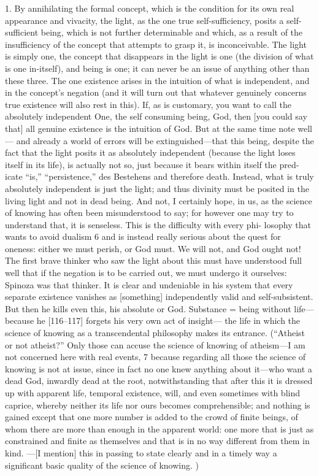 1.  By annihilating the formal concept,
which is the condition for its own real appearance and vivacity,
the light, as the one true self-sufficiency,
posits a self-sufficient being,
which is not further determinable and
which, as a result of the insufficiency of
the concept that attempts to grasp it,
is inconceivable.
The light is simply one,
the concept that disappears in the light is one
(the division of what is one in-itself),
and being is one;
it can never be an issue of anything other than these three.
The one existence arises in the intuition of what is independent,
and in the concept’s negation
(and it will turn out that whatever genuinely concerns
true existence will also rest in this).
If, as is customary, you want to call
the absolutely independent One,
the self consuming being, God,
then [you could say that] all
genuine existence is the intuition of God.
But at the same time note well—
and already a world of errors will be extinguished—that this being, despite the
fact that the light posits it as absolutely independent (because the light loses
itself in its life), is actually not so, just because it bears within itself the pred-
icate “is,” “persistence,” {des Bestehens} and therefore death.
Instead, what is
truly absolutely independent is just the light; and thus divinity must be posited
in the living light and not in dead being.
And not, I certainly hope, in us, as
the science of knowing has often been misunderstood to say; for however one
may try to understand that, it is senseless.
This is the difficulty with every phi-
losophy that wants to avoid dualism 6 and is instead really serious about the
quest for oneness: either we must perish, or God must.
We will not, and God
ought not! The first brave thinker who saw the light about this must have
understood full well that if the negation is to be carried out, we must undergo
it ourselves: Spinoza was that thinker.
It is clear and undeniable in his system
that every separate existence vanishes as [something] independently valid and
self-subsistent.
But then he kills even this, his absolute or God.
Substance =
being without life—because he [116–117] forgets his very own act of insight—
the life in which the science of knowing as a transcendental philosophy makes
its entrance.
(“Atheist or not atheist?” Only those can accuse the science of
knowing of atheism—I am not concerned here with real events, 7 because
regarding all those the science of knowing is not at issue, since in fact no one
knew anything about it—who want a dead God, inwardly dead at the root,
notwithstanding that after this it is dressed up with apparent life, temporal
existence, will, and even sometimes with blind caprice, whereby neither its life
nor ours becomes comprehensible; and nothing is gained except that one more
number is added to the crowd of finite beings, of whom there are more than
enough in the apparent world: one more that is just as constrained and finite
as themselves and that is in no way different from them in kind.
—[I mention]
this in passing to state clearly and in a timely way a significant basic quality of
the science of knowing.
)

